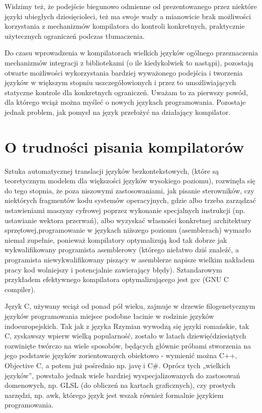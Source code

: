 Widzimy też, że podejście biegunowo odmienne od prezentowanego przez niektóre języki ubiegłych dziesięcioleci, też ma swoje wady a mianowicie brak możliwości korzystania z mechanizmów kompilatora do kontroli konkretnych, praktycznie użytecznych ograniczeń podczas tłumaczenia.

Do czasu wprowadzenia w kompilatorach wielkich języków ogólnego przeznaczenia mechanizmów integracji z bibliotekami (o ile kiedykolwiek to nastąpi), pozostają otwarte możliwości wykorzystania bardziej wyważonego podejścia i tworzenia języków w większym stopniu uszczegółowionych i przez to umożliwiających statyczne kontrole dla konkretnych ograniczeń. Uważam to za pierwszy powód, dla którego wciąż można myśleć o nowych językach programowania.
Pozostaje jednak problem, jak pomysł na język przełożyć na działający kompilator.

\section{O trudności pisania kompilatorów}
Sztuka automatycznej translacji języków bezkontekstowych, (które są teoretycznym modelem dla większości języków wysokiego poziomu), rozwinęła się do tego stopnia, że poza niszowymi zastosowaniami, jak pisanie sterowników, czy niektórych fragmentów kodu systemów operacyjnych, gdzie albo trzeba zarządzać ustawieniami maszyny cyfrowej poprzez wykonanie specjalnych instrukcji (np. ustawianie wektora przerwań), albo wyzyskać własności konkretnej architektury sprzętowej\cite{kernel_exception_handling},programowanie w językach niższego poziomu (asemblerach) wymarło niemal zupełnie, ponieważ kompilatory optymalizują kod tak dobrze jak wykwalifikowany programista asemblerowy\cite{FORTRAN_AUTOMATIC_CODING_SYSTEM} (którego niełatwo dziś znaleźć, a programista niewykwalifikowany piszący w asemblerze napisze wielkim nakładem pracy kod wolniejszy i potencjalnie zawierający błędy). Sztandarowym przykładem efektywnego kompilatora optymalizującego jest gcc (GNU C compiler).%

Język C, używany wciąż od ponad pół wieku, zajmuje w drzewie filogenetycznym języków programowania miejsce podobne łacinie w rodzinie języków indoeuropejskich. Tak jak z języka Rzymian wywodzą się języki romańskie, tak C, zyskawszy wpierw wielką popularność, zostało w latach dziewięćdziesiątych rozwinięte twórczo na wiele sposobów, będących głównie próbami stworzenia na jego podstawie języków zorientowanych obiektowo - wymienić można C++, Objective C, a potem już pośrednio np. javę i C\#.\cite{language_genealogical_tree_1} \cite{language_genealogical_tree_2}
Oprócz tych „wielkich języków”, powstało jednak wiele bardziej wyspecjalizowanych do zastosowań domenowych, np. GLSL (do obliczeń na kartach graficznych)\cite{opengl_shading_language_460}, czy prostych narzędzi, np. awk\cite{awk_man}, którego język jest wszak również formalnie językiem programowania.

